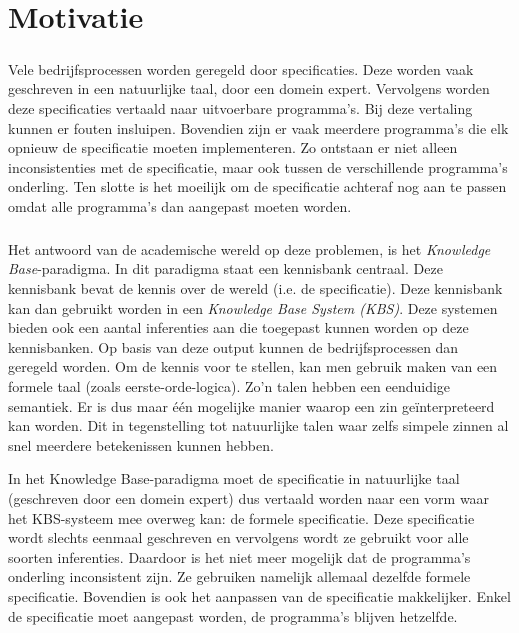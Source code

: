 \chapter{Motivatie}

\paragraph{} Vele bedrijfsprocessen worden geregeld door specificaties. Deze worden vaak geschreven in een natuurlijke taal, door een domein expert. Vervolgens worden deze specificaties vertaald naar uitvoerbare programma's. Bij deze vertaling kunnen er fouten insluipen. Bovendien zijn er vaak meerdere programma's die elk opnieuw de specificatie moeten implementeren. Zo ontstaan er niet alleen inconsistenties met de specificatie, maar ook tussen de verschillende programma's onderling. Ten slotte is het moeilijk om de specificatie achteraf nog aan te passen omdat alle programma's dan aangepast moeten worden.

\paragraph{} Het antwoord van de academische wereld op deze problemen, is het \textit{Knowledge Base}-paradigma. In dit paradigma staat een kennisbank centraal. Deze kennisbank bevat de kennis over de wereld (i.e. de specificatie). Deze kennisbank kan dan gebruikt worden in een \textit{Knowledge Base System (KBS)}. Deze systemen bieden ook een aantal inferenties aan die toegepast kunnen worden op deze kennisbanken. Op basis van deze output kunnen de bedrijfsprocessen dan geregeld worden. Om de kennis voor te stellen, kan men gebruik maken van een formele taal (zoals eerste-orde-logica). Zo'n talen hebben een eenduidige semantiek. Er is dus maar \'e\'en mogelijke manier waarop een zin ge\"interpreteerd kan worden. Dit in tegenstelling tot natuurlijke talen waar zelfs simpele zinnen al snel meerdere betekenissen kunnen hebben.

In het Knowledge Base-paradigma moet de specificatie in natuurlijke taal (geschreven door een domein expert) dus vertaald worden naar een vorm waar het KBS-systeem mee overweg kan: de formele specificatie. Deze specificatie wordt slechts eenmaal geschreven en vervolgens wordt ze gebruikt voor alle soorten inferenties. Daardoor is het niet meer mogelijk dat de programma's onderling inconsistent zijn. Ze gebruiken namelijk allemaal dezelfde formele specificatie. Bovendien is ook het aanpassen van de specificatie makkelijker. Enkel de specificatie moet aangepast worden, de programma's blijven hetzelfde.

